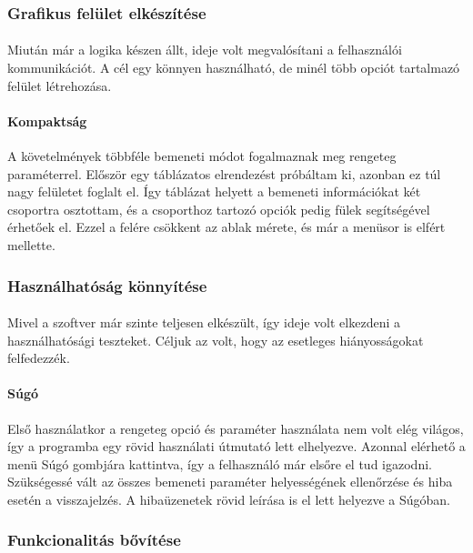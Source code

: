\documentclass[12pt]{report}
\begin{document}
\subsubsection{Grafikus felület elkészítése}
\paragraph{}
Miután már a logika készen állt, ideje volt megvalósítani a felhasználói kommunikációt. A cél egy könnyen használható, de minél több opciót tartalmazó felület létrehozása.

\paragraph{Kompaktság}
A követelmények többféle bemeneti módot fogalmaznak meg rengeteg paraméterrel. Először egy táblázatos elrendezést próbáltam ki, azonban ez túl nagy felületet foglalt el. Így táblázat helyett a bemeneti információkat két csoportra osztottam, és a csoporthoz tartozó opciók pedig fülek segítségével érhetőek el. Ezzel a felére csökkent az ablak mérete, és már a menüsor is elfért mellette.

\subsubsection{Használhatóság könnyítése}
\paragraph{}
Mivel a szoftver már szinte teljesen elkészült, így ideje volt elkezdeni a használhatósági teszteket. Céljuk az volt, hogy az esetleges hiányosságokat felfedezzék.

\paragraph{Súgó}
Első használatkor a rengeteg opció és paraméter használata nem volt elég világos, így a programba egy rövid használati útmutató lett elhelyezve. Azonnal elérhető a menü Súgó gombjára kattintva, így a felhasználó már elsőre el tud igazodni. Szükségessé vált az összes bemeneti paraméter helyességének ellenőrzése és hiba esetén a visszajelzés. A hibaüzenetek rövid leírása is el lett helyezve a Súgóban.

\subsubsection{Funkcionalitás bővítése}
\end{document}
